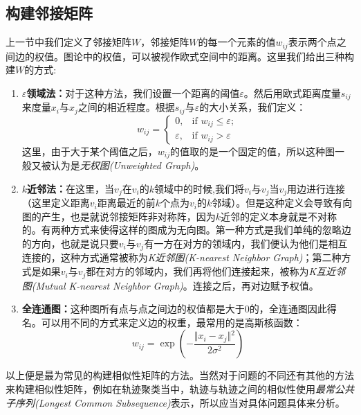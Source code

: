 \documentclass[UTF8, 12pt]{ctexart}
\begin{document}

\subsection{构建邻接矩阵}
上一节中我们定义了邻接矩阵$W$，邻接矩阵$W$的每一个元素的值${w_{ij}}$表示两个点之间边的权值。图论中的权值，可以被视作欧式空间中的距离。这里我们给出三种构建$W$的方式:
\begin{enumerate}
	\item \textbf{$\varepsilon$领域法：}对于这种方法，我们设置一个距离的阈值$\varepsilon$。然后用欧式距离度量${s_{ij}}$来度量$x_i$与$x_j$之间的相近程度。根据${s_{ij}}$与$\varepsilon$的大小关系，我们定义：
	\begin{equation}
	{w_{ij}} = \begin{cases}
	0, & \text{if } {w_{ij}} \le \varepsilon; \\
	\varepsilon, & \text{if } {w_{ij}} > \varepsilon
	\end{cases}
	\end{equation}
	这里，由于大于某个阈值之后，${w_{ij}}$的值取的是一个固定的值，所以这种图一般又被认为是\emph{无权图(Unweighted Graph)}。
	
	\item \textbf{$k$近邻法：}在这里，当$v_j$在$v_i$的$k$领域中的时候,我们将$v_i$与$v_j$当$v_j$用边进行连接（这里定义距离$v_i$距离最近的前$k$个点为$v_i$的$k$邻域）。但是这种定义会导致有向图的产生，也是就说邻接矩阵非对称阵，因为$k$近邻的定义本身就是不对称的。有两种方式来使得这样的图成为无向图。第一种方式是我们单纯的忽略边的方向，也就是说只要$v_i$与$v_j$有一方在对方的领域内，我们便认为他们是相互连接的，这种方式通常被称为\emph{K近邻图(K-nearest Neighbor Graph)}；第二种方式是如果$v_i$与$v_j$都在对方的邻域内，我们再将他们连接起来，被称为\emph{K互近邻图(Mutual K-nearest Neighbor Graph)}。连接之后，再对边赋予权值。
	
	\item \textbf{全连通图：}这种图所有点与点之间边的权值都是大于$0$的，全连通图因此得名。可以用不同的方式来定义边的权重，最常用的是高斯核函数：
	\begin{equation}
	{w_{ij}} = \exp ( - \frac{{\Vert {x_i} - {x_j} \Vert {^2}}}{{2{\sigma ^2}}})
	\end{equation}
\end{enumerate}

以上便是最为常见的构建相似性矩阵的方法。当然对于问题的不同还有其他的方法来构建相似性矩阵，例如在轨迹聚类当中，轨迹与轨迹之间的相似性使用\emph{最常公共子序列(Longest Common Subsequence)}表示，所以应当对具体问题具体来分析。
\end{document}
